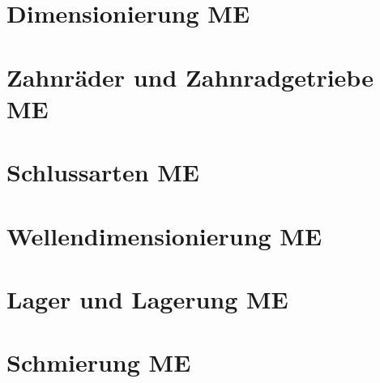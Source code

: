 \documentclass[numerate]{cheatsheet}
\author{Nina Schmidt - nischmidt$@$ethz.ch}
\begin{document}
\renewcommand{\multirowsetup}{\centering} %
\setlength{\tabcolsep}{4pt}
\newcommand{\cbreak}{%
    \vfill\null\columnbreak%
}

\makeatletter
\newcommand{\pushright}[1]{\ifmeasuring@#1\else\omit\hfill$\displaystyle#1$\fi\ignorespaces}
\newcommand{\pushleft}[1]{\ifmeasuring@#1\else\omit$\displaystyle#1$\hfill\fi\ignorespaces}
\makeatother


\section{Dimensionierung \hfill ME}
    

\section{Zahnräder und Zahnradgetriebe \hfill ME}
    
    
    \cbreak
    
    
    
    
    
    

\section{Schlussarten \hfill ME}
    
    \cbreak
    
    

\section{Wellendimensionierung \hfill ME}
    
    
    

\section{Lager und Lagerung \hfill ME}
    
    \cbreak
    

\section{Schmierung \hfill ME}
    
\end{document}
